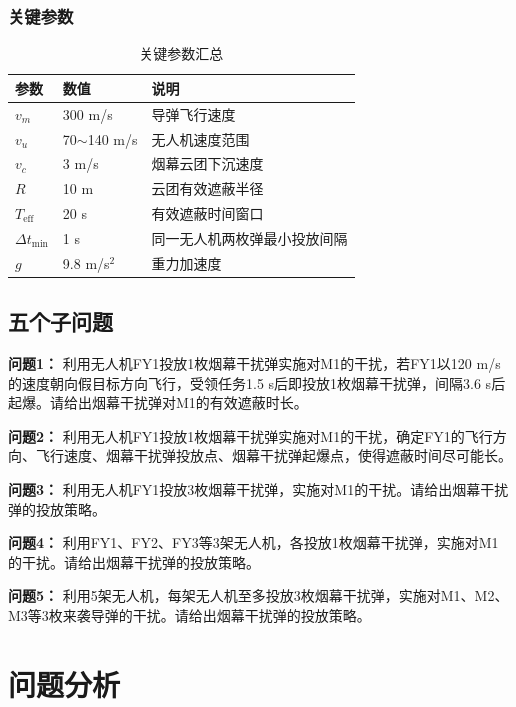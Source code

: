 \documentclass[12pt,a4paper]{article}
\begin{document}
\subsubsection{关键参数}

\begin{table}[H]
    \centering
    \caption{关键参数汇总}
    \label{tab:parameters}
    \begin{tabular}{lll}
        \toprule
        参数 & 数值 & 说明 \\
        \midrule
        $v_m$ & 300 m/s & 导弹飞行速度 \\
        $v_u$ & 70$\sim$140 m/s & 无人机速度范围 \\
        $v_c$ & 3 m/s & 烟幕云团下沉速度 \\
        $R$ & 10 m & 云团有效遮蔽半径 \\
        $T_{\text{eff}}$ & 20 s & 有效遮蔽时间窗口 \\
        $\Delta t_{\min}$ & 1 s & 同一无人机两枚弹最小投放间隔 \\
        $g$ & 9.8 m/s$^2$ & 重力加速度 \\
        \bottomrule
    \end{tabular}
\end{table}

\subsection{五个子问题}

\textbf{问题1：} 利用无人机FY1投放1枚烟幕干扰弹实施对M1的干扰，若FY1以120 m/s的速度朝向假目标方向飞行，受领任务1.5 s后即投放1枚烟幕干扰弹，间隔3.6 s后起爆。请给出烟幕干扰弹对M1的有效遮蔽时长。

\textbf{问题2：} 利用无人机FY1投放1枚烟幕干扰弹实施对M1的干扰，确定FY1的飞行方向、飞行速度、烟幕干扰弹投放点、烟幕干扰弹起爆点，使得遮蔽时间尽可能长。

\textbf{问题3：} 利用无人机FY1投放3枚烟幕干扰弹，实施对M1的干扰。请给出烟幕干扰弹的投放策略。

\textbf{问题4：} 利用FY1、FY2、FY3等3架无人机，各投放1枚烟幕干扰弹，实施对M1的干扰。请给出烟幕干扰弹的投放策略。

\textbf{问题5：} 利用5架无人机，每架无人机至多投放3枚烟幕干扰弹，实施对M1、M2、M3等3枚来袭导弹的干扰。请给出烟幕干扰弹的投放策略。


\section{问题分析}
\end{document}
